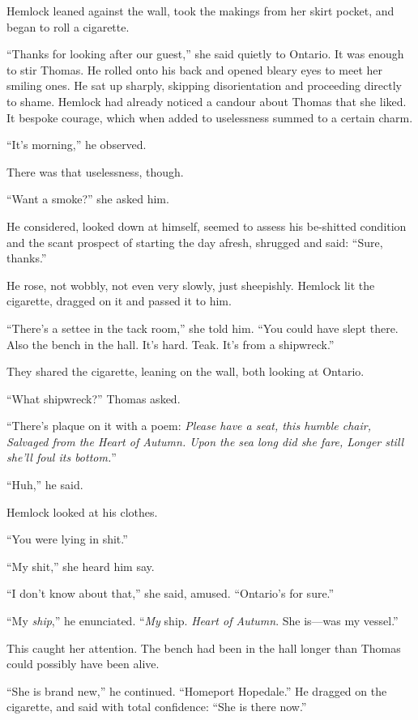 \documentclass[11pt,a5paper]{article}
\begin{document}
Hemlock leaned against the wall, took the makings from her skirt pocket, and began to roll a cigarette.

``Thanks for looking after our guest,'' she said quietly to Ontario. It was enough to stir Thomas. He rolled onto his back and opened bleary eyes to meet her smiling ones. He sat up sharply, skipping disorientation and proceeding directly to shame. Hemlock had already noticed a candour about Thomas that she liked. It bespoke courage, which when added to uselessness summed to a certain charm.

``It's morning,'' he observed.

There was that uselessness, though.

``Want a smoke?'' she asked him.

He considered, looked down at himself, seemed to assess his be-shitted condition and the scant prospect of starting the day afresh, shrugged and said: ``Sure, thanks.''

He rose, not wobbly, not even very slowly, just sheepishly. Hemlock lit the cigarette, dragged on it and passed it to him.

``There's a settee in the tack room,'' she told him. ``You could have slept there. Also the bench in the hall. It's hard. Teak. It's from a shipwreck.''

They shared the cigarette, leaning on the wall, both looking at Ontario.

``What shipwreck?'' Thomas asked.

``There's plaque on it with a poem: \emph{Please have a seat, this humble chair, Salvaged from the Heart of Autumn. Upon the sea long did she fare, Longer still she'll foul its bottom.}''

``Huh,'' he said.

Hemlock looked at his clothes.

``You were lying in shit.''

``My shit,'' she heard him say.

``I don't know about that,'' she said, amused. ``Ontario's for sure.''

``My \emph{ship},'' he enunciated. ``\emph{My} ship. \emph{Heart of Autumn}. She is---was my vessel.''

This caught her attention. The bench had been in the hall longer than Thomas could possibly have been alive.

``She is brand new,'' he continued. ``Homeport Hopedale.'' He dragged on the cigarette, and said with total confidence: ``She is there now.''
\end{document}
